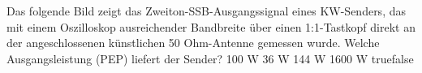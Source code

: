    {Das folgende Bild zeigt das Zweiton-SSB-Ausgangssignal eines KW-Senders, das mit einem Oszilloskop ausreichender Bandbreite über einen 1:1-Tastkopf direkt an der angeschlossenen künstlichen 50 Ohm-Antenne gemessen wurde. Welche Ausgangsleistung (PEP) liefert der Sender?}
    {100 W}
    {36 W}
    {144 W}
    {1600 W}
    {true}{false}
